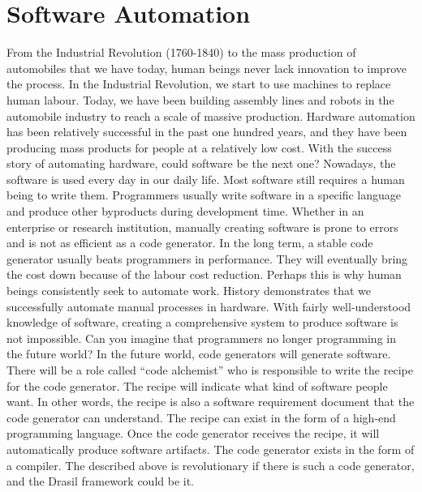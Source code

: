 \chapter{Software Automation}
From the Industrial Revolution (1760-1840) to the mass production of automobiles that we have today, human beings never lack innovation to improve the process. In the Industrial Revolution, we start to use machines to replace human labour. Today, we have been building assembly lines and robots in the automobile industry to reach a scale of massive production. Hardware automation has been relatively successful in the past one hundred years, and they have been producing mass products for people at a relatively low cost. With the success story of automating hardware, could software be the next one? Nowadays, the software is used every day in our daily life. Most software still requires a human being to write them. Programmers usually write software in a specific language and produce other byproducts during development time. Whether in an enterprise or research institution, manually creating software is prone to errors and is not as efficient as a code generator. In the long term, a stable code generator usually beats programmers in performance. They will eventually bring the cost down because of the labour cost reduction. Perhaps this is why human beings consistently seek to automate work. History demonstrates that we successfully automate manual processes in hardware. With fairly well-understood knowledge of software, creating a comprehensive system to produce software is not impossible. Can you imagine that programmers no longer programming in the future world? In the future world, code generators will generate software. There will be a role called ``code alchemist'' who is responsible to write the recipe for the code generator. The recipe will indicate what kind of software people want. In other words, the recipe is also a software requirement document that the code generator can understand. The recipe can exist in the form of a high-end programming language. Once the code generator receives the recipe, it will automatically produce software artifacts. The code generator exists in the form of a compiler. The described above is revolutionary if there is such a code generator, and the Drasil framework could be it.